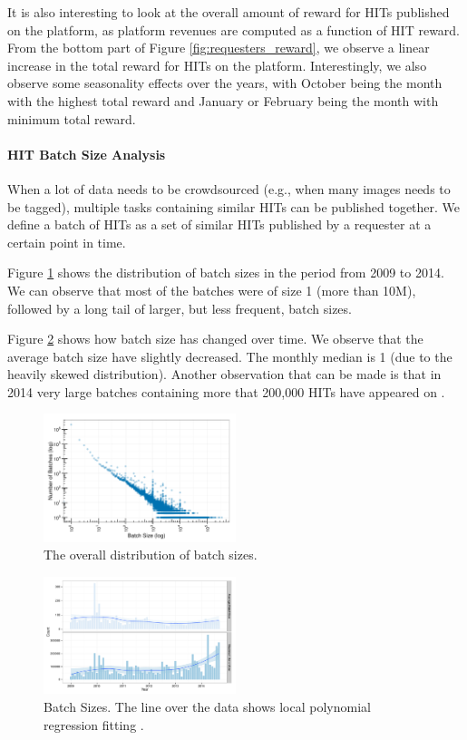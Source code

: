 It is also interesting to look at the overall amount of reward for HITs published on the platform, as platform revenues are computed as a function of HIT reward. From the bottom part of Figure \ref{fig:requesters_reward}, we observe a linear increase in the total reward for HITs on the platform. Interestingly, we also observe some seasonality effects over the years, with October being the month with the highest total reward and January or February being the month with minimum total reward.


\paragraph{HIT Batch Size Analysis}
When a lot of data needs to be crowdsourced (e.g., when many images needs to be tagged), multiple  tasks containing similar HITs can be published together. We define a batch of HITs as a set of similar HITs published by a requester at a certain point in time. 

Figure \ref{fig:batch_size_pow} shows the distribution of batch sizes in the period from 2009 to 2014. We can observe that most of the batches were of size 1 (more than 10M), followed by a long tail of larger, but less frequent, batch sizes.

Figure \ref{fig:batch_size} shows how batch size has changed over time. We observe that the average batch size have slightly decreased. The monthly median is 1 (due to the heavily skewed distribution). Another observation that can be made is that in 2014 very large batches containing more that 200,000 HITs have appeared on \amt{}.

\begin{figure}[tb]
	\centering
		\includegraphics[width=0.5\textwidth]{figures/powerlaw}
	\caption{The overall distribution of batch sizes.}
	\label{fig:batch_size_pow}
\end{figure}

\begin{figure}[tb]
	\centering
		\includegraphics[width=0.5\textwidth]{figures/batch_size}
	\caption{Batch Sizes. The line over the data shows local polynomial regression fitting \cite{cleveland1992local}.}
	\label{fig:batch_size}
\end{figure}


